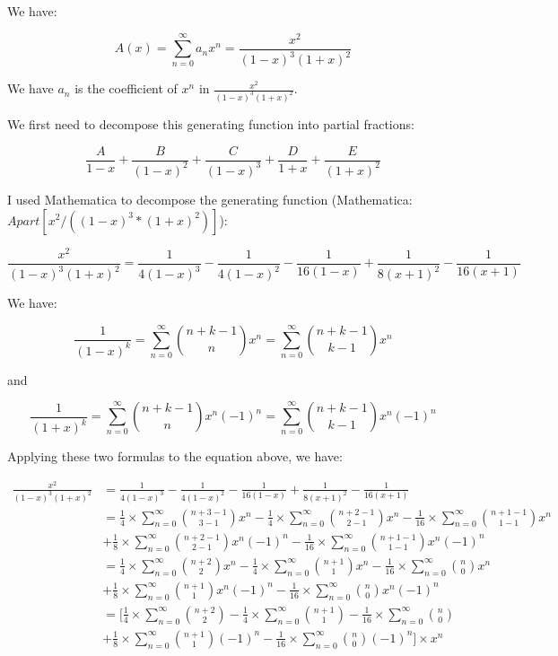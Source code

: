 \documentclass[10pt]{article}
\begin{document}
\begin{enumerate}
\begin{enumerate}
We have:

$$A(x) = \sum\limits_{n=0}^{\infty}a_nx^n=\frac{x^2}{(1-x)^3(1+x)^2}$$ 

We have $a_n$ is the coefficient of $x^n$ in $\frac{x^2}{(1-x)^3(1+x)^2}$.

We first need to decompose this generating function into partial fractions:

$$\frac{A}{1-x} + \frac{B}{(1-x)^2} + \frac{C}{(1-x)^3} + \frac{D}{1+x} + \frac{E}{(1+x)^2}$$

I used Mathematica to decompose the generating function (Mathematica: $Apart[x^2 / ((1 - x)^3 * (1 + x)^2)]$):

$$\frac{x^2}{(1-x)^3(1+x)^2} = \frac{1}{4(1-x)^3}-\frac{1}{4(1-x)^2}-\frac{1}{16(1-x)}+\frac{1}{8(x+1)^2}-\frac{1}{16(x+1)}$$

We have:

$$\frac{1}{(1-x)^k}=\sum\limits_{n=0}^{\infty}\binom{n+k-1}{n}x^n=\sum\limits_{n=0}^{\infty}\binom{n+k-1}{k-1}x^n$$

and

$$\frac{1}{(1+x)^k}=\sum\limits_{n=0}^{\infty}\binom{n+k-1}{n}x^n(-1)^n=\sum\limits_{n=0}^{\infty}\binom{n+k-1}{k-1}x^n(-1)^n$$

Applying these two formulas to the equation above, we have:

\begin{align*}
    \frac{x^2}{(1-x)^3(1+x)^2} &= \frac{1}{4(1-x)^3}-\frac{1}{4(1-x)^2}-\frac{1}{16(1-x)}+\frac{1}{8(x+1)^2}-\frac{1}{16(x+1)} \\
    &= \frac{1}{4} \times \sum\limits_{n=0}^{\infty}\binom{n+3-1}{3-1}x^n - \frac{1}{4}\times \sum\limits_{n=0}^{\infty}\binom{n+2-1}{2-1}x^n -\frac{1}{16} \times \sum\limits_{n=0}^{\infty}\binom{n+1-1}{1-1}x^n \\ & + \frac{1}{8} \times \sum\limits_{n=0}^{\infty}\binom{n+2-1}{2-1}x^n(-1)^n - \frac{1}{16} \times \sum\limits_{n=0}^{\infty}\binom{n+1-1}{1-1}x^n(-1)^n \\
    &= \frac{1}{4} \times \sum\limits_{n=0}^{\infty}\binom{n+2}{2}x^n - \frac{1}{4}\times \sum\limits_{n=0}^{\infty}\binom{n+1}{1}x^n -\frac{1}{16} \times \sum\limits_{n=0}^{\infty}\binom{n}{0}x^n \\ & + \frac{1}{8} \times \sum\limits_{n=0}^{\infty}\binom{n+1}{1}x^n(-1)^n - \frac{1}{16} \times \sum\limits_{n=0}^{\infty}\binom{n}{0}x^n(-1)^n \\
    &= [\frac{1}{4} \times \sum\limits_{n=0}^{\infty}\binom{n+2}{2} - \frac{1}{4}\times \sum\limits_{n=0}^{\infty}\binom{n+1}{1} -\frac{1}{16} \times \sum\limits_{n=0}^{\infty}\binom{n}{0}\\ & + \frac{1}{8} \times \sum\limits_{n=0}^{\infty}\binom{n+1}{1}(-1)^n - \frac{1}{16} \times \sum\limits_{n=0}^{\infty}\binom{n}{0}(-1)^n]\times x^n
\end{align*}


\end{enumerate}
\end{enumerate}
\end{document}

